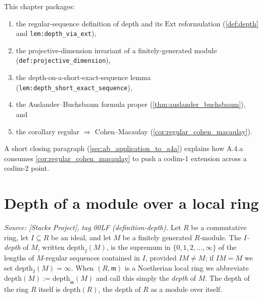 This chapter packages:
\begin{enumerate}
  \item the regular-sequence definition of depth and its \(\text{Ext}\) reformulation
    (\cref{def:depth} and \texttt{lem:depth_via_ext}),
  \item the projective-dimension invariant of a finitely-generated module
    (\texttt{def:projective_dimension}),
  \item the depth-on-a-short-exact-sequence lemma
    (\texttt{lem:depth_short_exact_sequence}),
  \item the Auslander--Buchsbaum formula proper
    (\cref{thm:auslander_buchsbaum}), and
  \item the corollary regular \(\Rightarrow\) Cohen--Macaulay
    (\cref{cor:regular_cohen_macaulay}).
\end{enumerate}
A short closing paragraph (\cref{sec:ab_application_to_a4a}) explains how A.4.a
consumes \cref{cor:regular_cohen_macaulay} to push a codim-1 extension across a
codim-2 point.

\section{Depth of a module over a local ring}
\label{sec:ab_depth}

\begin{definition}

  \label{def:depth}
  \textit{Source: [Stacks Project], tag 00LF (definition-depth).}
  Let \(R\) be a commutative ring, let \(I \subseteq R\) be an ideal, and let \(M\) be a finitely
  generated \(R\)-module. The \emph{\(I\)-depth} of \(M\), written \(\text{depth}_I(M)\), is the
  supremum in \(\{0, 1, 2, \dots, \infty\}\) of the lengths of \(M\)-regular sequences contained
  in \(I\), provided \(IM \neq M\); if \(IM = M\) we set \(\text{depth}_I(M) = \infty\). When
  \((R, \mathfrak{m})\) is a Noetherian local ring we abbreviate
  \(\text{depth}(M) := \text{depth}_{\mathfrak{m}}(M)\) and call this simply the
  \emph{depth} of \(M\). The depth of the ring \(R\) itself is \(\text{depth}(R)\), the depth
  of \(R\) as a module over itself.
\end{definition}

